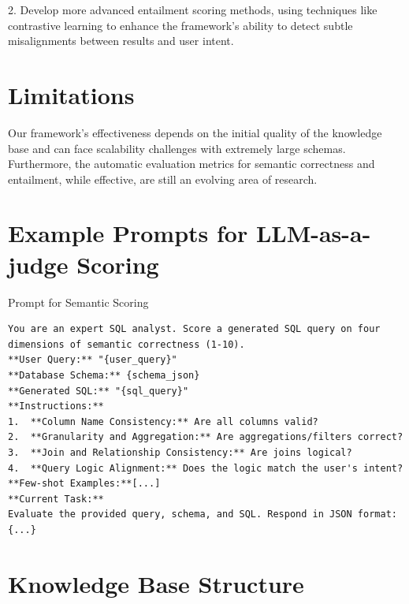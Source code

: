 \documentclass[runningheads]{llncs}
\begin{document}
2. Develop more advanced entailment scoring methods, using techniques like contrastive learning to enhance the framework's ability to detect subtle misalignments between results and user intent.

\section{Limitations}
Our framework's effectiveness depends on the initial quality of the knowledge base and can face scalability challenges with extremely large schemas. Furthermore, the automatic evaluation metrics for semantic correctness and entailment, while effective, are still an evolving area of research.

\newpage
\appendix
\section{Example Prompts for LLM-as-a-judge Scoring}

Prompt for Semantic Scoring
\begin{footnotesize}
\begin{verbatim}
You are an expert SQL analyst. Score a generated SQL query on four
dimensions of semantic correctness (1-10).
**User Query:** "{user_query}"
**Database Schema:** {schema_json}
**Generated SQL:** "{sql_query}"
**Instructions:**
1.  **Column Name Consistency:** Are all columns valid?
2.  **Granularity and Aggregation:** Are aggregations/filters correct?
3.  **Join and Relationship Consistency:** Are joins logical?
4.  **Query Logic Alignment:** Does the logic match the user's intent?
**Few-shot Examples:**[...]
**Current Task:**
Evaluate the provided query, schema, and SQL. Respond in JSON format:{...}
\end{verbatim}
\end{footnotesize}

\section{Knowledge Base Structure}\label{sec:appendix-kb-example}
\end{document}
